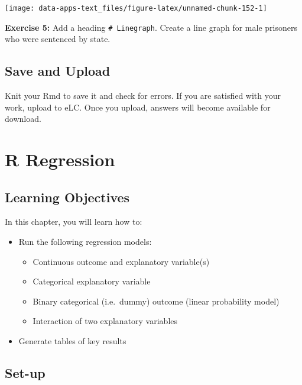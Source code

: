 \documentclass[
]{book}
\providecommand{\tightlist}{%
  \setlength{\itemsep}{0pt}\setlength{\parskip}{0pt}}
\newenvironment{rmdblock}[1]
  {\begin{shaded*}
  }
  {\end{shaded*}
  }
\newenvironment{learncheck}
  {\begin{rmdblock}{warning}}
  {\end{rmdblock}}
\begin{document}
\begin{center}\texttt{[image: data-apps-text\_files/figure-latex/unnamed-chunk-152-1]} \end{center}

\begin{learncheck}
\textbf{Exercise 5:} Add a heading \texttt{\#\ Linegraph}. Create a line
graph for male prisoners who were sentenced by state.
\end{learncheck}

\hypertarget{save-and-upload}{%
\section{Save and Upload}\label{save-and-upload}}

Knit your Rmd to save it and check for errors. If you are satisfied with your work, upload to eLC. Once you upload, answers will become available for download.

\hypertarget{r-regression}{%
\chapter{R Regression}\label{r-regression}}

\hypertarget{learning-objectives}{%
\section{Learning Objectives}\label{learning-objectives}}

In this chapter, you will learn how to:

\begin{itemize}
\tightlist
\item
  Run the following regression models:

  \begin{itemize}
  \tightlist
  \item
    Continuous outcome and explanatory variable(s)
  \item
    Categorical explanatory variable
  \item
    Binary categorical (i.e.~dummy) outcome (linear probability model)
  \item
    Interaction of two explanatory variables
  \end{itemize}
\item
  Generate tables of key results
\end{itemize}

\hypertarget{set-up}{%
\section{Set-up}\label{set-up}}
\end{document}
